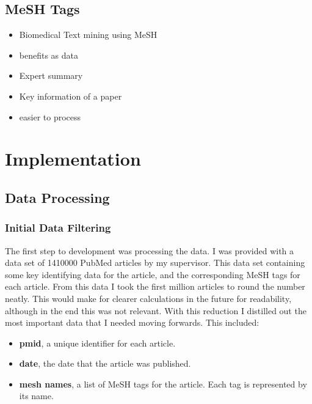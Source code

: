 \documentclass{l4proj}
\begin{document}
\section{MeSH Tags}
\begin{itemize}
    \item Biomedical Text mining using MeSH
    \item benefits as data 
    \item Expert summary
    \item Key information of a paper
    \item easier to process
\end{itemize}

\chapter{Implementation}
\section{Data Processing}
\subsection{Initial Data Filtering}

The first step to development was processing the data. I was provided with a data set of 1410000 PubMed articles by my supervisor. This data set containing some key identifying data for the article, and the corresponding MeSH tags for each article. From this data I took the first million articles to round the number neatly. This would make for clearer calculations in the future for readability, although in the end this was not relevant. With this reduction I distilled out the most important data that I needed moving forwards. This included:
\\
\begin{itemize}
    \item \textbf{pmid}, a unique identifier for each article.
    \item \textbf{date}, the date that the article was published.
    \item \textbf{mesh names}, a list of MeSH tags for the article. Each tag is represented by its name. \\
\end{itemize}
\end{document}
